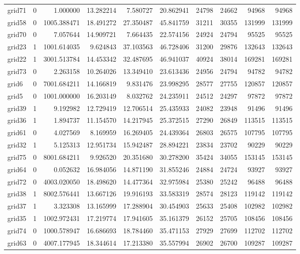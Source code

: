 \begin{longtable}{|l|r|r|r|r|r|r|r|r|r|}
grid71 & 0 & 1.000000 & 13.282214 & 7.580727 & 20.862941 & 24798 & 24662 & 94968 & 94968 \\
grid58 & 0 & 1005.388471 & 18.491272 & 27.350487 & 45.841759 & 31211 & 30355 & 131999 & 131999 \\
grid70 & 0 & 7.057644 & 14.909721 & 7.664435 & 22.574156 & 24924 & 24794 & 95525 & 95525 \\
grid23 & 1 & 1001.614035 & 9.624843 & 37.103563 & 46.728406 & 31200 & 29876 & 132643 & 132643 \\
grid22 & 1 & 3001.513784 & 14.453342 & 32.487695 & 46.941037 & 40924 & 38014 & 169281 & 169281 \\
grid73 & 0 & 2.263158 & 10.264026 & 13.349410 & 23.613436 & 24956 & 24794 & 94782 & 94782 \\
grid6 & 0 & 7001.684211 & 14.166819 & 9.831476 & 23.998295 & 28577 & 27755 & 120857 & 120857 \\
grid5 & 0 & 1001.000000 & 16.203149 & 8.032762 & 24.235911 & 24512 & 24297 & 97872 & 97872 \\
grid39 & 1 & 9.192982 & 12.729419 & 12.706514 & 25.435933 & 24082 & 23948 & 91496 & 91496 \\
grid36 & 1 & 1.894737 & 11.154570 & 14.217945 & 25.372515 & 27290 & 26849 & 113515 & 113515 \\
grid61 & 0 & 4.027569 & 8.169959 & 16.269405 & 24.439364 & 26803 & 26575 & 107795 & 107795 \\
grid32 & 1 & 5.125313 & 12.951734 & 15.942487 & 28.894221 & 23834 & 23702 & 90229 & 90229 \\
grid75 & 0 & 8001.684211 & 9.926520 & 20.351680 & 30.278200 & 35424 & 34055 & 153145 & 153145 \\
grid64 & 0 & 0.052632 & 16.984056 & 14.871190 & 31.855246 & 24884 & 24724 & 93927 & 93927 \\
grid72 & 0 & 4003.020050 & 18.498620 & 14.477364 & 32.975984 & 25380 & 25242 & 96488 & 96488 \\
grid38 & 1 & 8002.576441 & 13.667126 & 19.916193 & 33.583319 & 28574 & 28123 & 119142 & 119142 \\
grid37 & 1 & 3.323308 & 13.165999 & 17.288904 & 30.454903 & 25633 & 25408 & 102982 & 102982 \\
grid35 & 1 & 1002.972431 & 17.219774 & 17.941605 & 35.161379 & 26152 & 25705 & 108456 & 108456 \\
grid74 & 0 & 1000.578947 & 16.686693 & 18.784460 & 35.471153 & 27929 & 27699 & 112702 & 112702 \\
grid63 & 0 & 4007.177945 & 18.344614 & 17.213380 & 35.557994 & 26902 & 26700 & 109287 & 109287 \\

\end{longtable}
